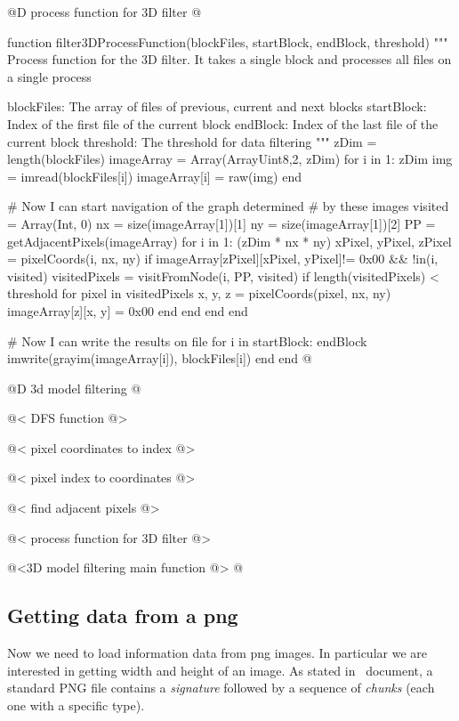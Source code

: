\documentclass[11pt,oneside]{article}	%
\begin{document}
@D process function for 3D filter
@{function filter3DProcessFunction(blockFiles, startBlock, endBlock, threshold)
  """
  Process function for the 3D filter.
  It takes a single block and processes all files
  on a single process
  
  blockFiles: The array of files of previous, current and next blocks
  startBlock: Index of the first file of the current block
  endBlock: Index of the last file of the current block
  threshold: The threshold for data filtering
  """
  zDim = length(blockFiles)
  imageArray = Array(Array{Uint8,2}, zDim)
  for i in 1: zDim
      img = imread(blockFiles[i])
      imageArray[i] = raw(img)
  end

  # Now I can start navigation of the graph determined
  # by these images
  visited = Array(Int, 0)
  nx = size(imageArray[1])[1]
  ny = size(imageArray[1])[2]
  PP = getAdjacentPixels(imageArray)
  for i in 1: (zDim * nx * ny)
    xPixel, yPixel, zPixel = pixelCoords(i, nx, ny)
    if imageArray[zPixel][xPixel, yPixel]!= 0x00 && !in(i, visited)
      visitedPixels = visitFromNode(i, PP, visited)
      if length(visitedPixels) < threshold
        for pixel in visitedPixels
          x, y, z = pixelCoords(pixel, nx, ny)
          imageArray[z][x, y] = 0x00
        end
      end
    end
  end
  
  # Now I can write the results on file
  for i in startBlock: endBlock
    imwrite(grayim(imageArray[i]), blockFiles[i])
  end
end @}

@D 3d model filtering
@{@< DFS function @>

@< pixel coordinates to index @>

@< pixel index to coordinates @>

@< find adjacent pixels @>

@< process function for 3D filter @>

@<3D model filtering main function @> @}

\subsection{Getting data from a png}\label{sec:getData}

Now we need to load information data from png images. In particular we are interested in getting width and height of an image. As stated in~\cite{W3CPNG} document, a standard PNG file contains a \textit{signature} followed by a sequence of \textit{chunks} (each one with a specific type).\\
\end{document}
